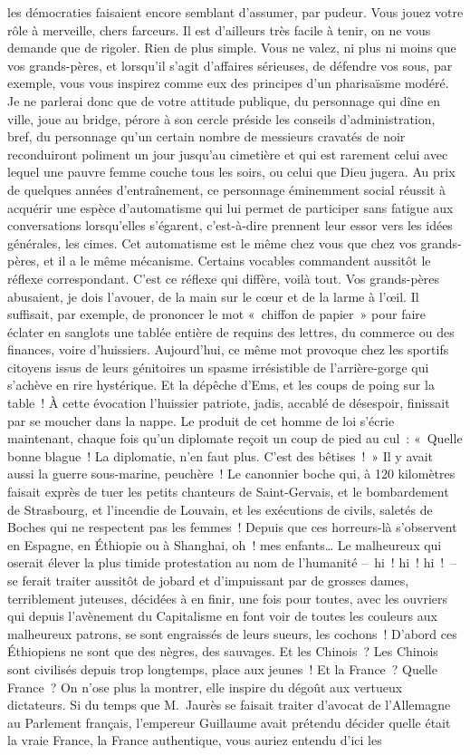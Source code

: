 \documentclass[french,twoside]{book} %
\begin{document}
les démocraties faisaient encore semblant d’assumer, par pudeur. Vous jouez votre rôle à merveille, chers farceurs. Il est d’ailleurs très facile à tenir, on ne vous demande que de rigoler. Rien de plus simple. Vous ne valez, ni plus ni moins que vos grands-pères, et lorsqu’il s’agit d’affaires sérieuses, de défendre vos sous, par exemple, vous vous inspirez comme eux des principes d’un pharisaïsme modéré. Je ne parlerai donc que de votre attitude publique, du personnage qui dîne en ville, joue au bridge, pérore à son cercle préside les conseils d’administration, bref, du personnage qu’un certain nombre de messieurs cravatés de noir reconduiront poliment un jour jusqu’au cimetière et qui est rarement celui avec lequel une pauvre femme couche tous les soirs, ou celui que Dieu jugera. Au prix de quelques années d’entraînement, ce personnage éminemment social réussit à acquérir une espèce d’automatisme qui lui permet de participer sans fatigue aux conversations lorsqu’elles s’égarent, c’est-à-dire prennent leur essor vers les idées générales, les cimes. Cet automatisme est le même chez vous que chez vos grands-pères, et il a le même mécanisme. Certains vocables commandent aussitôt le réflexe correspondant. C’est ce réflexe qui diffère, voilà tout. Vos grands-pères abusaient, je dois l’avouer, de la main sur le cœur et de la larme à l’œil. Il suffisait, par exemple, de prononcer le mot « chiffon de papier » pour faire éclater en sanglots une tablée entière de requins des lettres, du commerce ou des finances, voire d’huissiers. Aujourd’hui, ce même mot provoque chez les sportifs citoyens issus de leurs génitoires un spasme irrésistible de l’arrière-gorge qui s’achève en rire hystérique. Et la dépêche d’Ems, et les coups de poing sur la table ! À cette évocation l’huissier patriote, jadis, accablé de désespoir, finissait par se moucher dans la nappe. Le produit de cet homme de loi s’écrie maintenant, chaque fois qu’un diplomate reçoit un coup de pied au cul : « Quelle bonne blague ! La diplomatie, n’en faut plus. C’est des bêtises ! » Il y avait aussi la guerre sous-marine, peuchère ! Le canonnier boche qui, à 120 kilomètres faisait exprès de tuer les petits chanteurs de Saint-Gervais, et le bombardement de Strasbourg, et l’incendie de Louvain, et les exécutions de civils, saletés de Boches qui ne respectent pas les femmes ! Depuis que ces horreurs-là s’observent en Espagne, en Éthiopie ou à Shanghai, oh ! mes enfants… Le malheureux qui oserait élever la plus timide protestation au nom de l’humanité – hi ! hi ! hi ! – se ferait traiter aussitôt de jobard et d’impuissant par de grosses dames, terriblement juteuses, décidées à en finir, une fois pour toutes, avec les ouvriers qui depuis l’avènement du Capitalisme en font voir de toutes les couleurs aux malheureux patrons, se sont engraissés de leurs sueurs, les cochons ! D’abord ces Éthiopiens ne sont que des nègres, des sauvages. Et les Chinois ? Les Chinois sont civilisés depuis trop longtemps, place aux jeunes ! Et la France ? Quelle France ? On n’ose plus la montrer, elle inspire du dégoût aux vertueux dictateurs. Si du temps que M. Jaurès se faisait traiter d’avocat de l’Allemagne au Parlement français, l’empereur Guillaume avait prétendu décider quelle était la vraie France, la France authentique, vous auriez entendu d’ici les 
\end{document}

